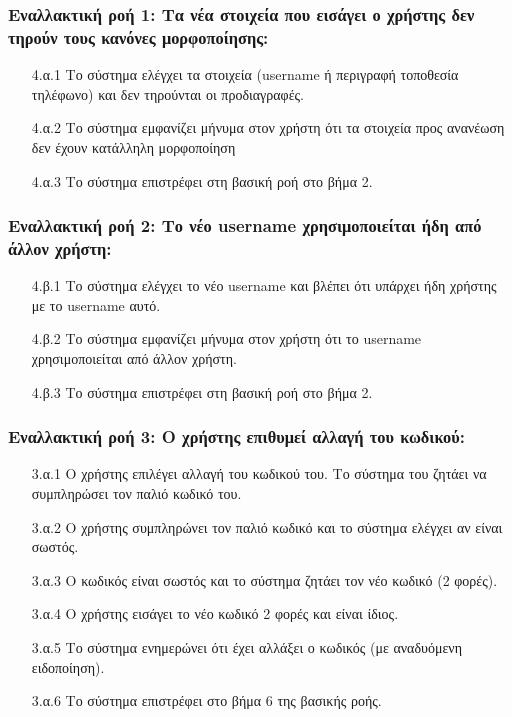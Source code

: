 \documentclass[12pt,a4paper]{article}
\begin{document}
\subsubsection*{Εναλλακτική ροή 1: Τα νέα στοιχεία που εισάγει ο χρήστης δεν τηρούν τους κανόνες μορφοποίησης:}
\begin{enumerate}
    \item [4.α.1] Το σύστημα ελέγχει τα στοιχεία (username ή περιγραφή τοποθεσία τηλέφωνο) και δεν τηρούνται οι προδιαγραφές.
    \item [4.α.2] Το σύστημα εμφανίζει μήνυμα στον χρήστη ότι τα στοιχεία προς ανανέωση δεν έχουν κατάλληλη μορφοποίηση
    \item [4.α.3] Το σύστημα επιστρέφει στη βασική ροή στο βήμα 2.  
\end{enumerate}

\subsubsection*{Εναλλακτική ροή 2: Το νέο username χρησιμοποιείται ήδη από άλλον χρήστη:}
\begin{enumerate}
    \item [4.β.1] Το σύστημα ελέγχει το νέο username και βλέπει ότι υπάρχει ήδη χρήστης με το username αυτό. 
    \item [4.β.2] Το σύστημα εμφανίζει μήνυμα στον χρήστη ότι το username χρησιμοποιείται από άλλον χρήστη.  
    \item [4.β.3] Το σύστημα επιστρέφει στη βασική ροή στο βήμα 2.
\end{enumerate}

\subsubsection*{Εναλλακτική ροή 3: Ο χρήστης επιθυμεί αλλαγή του κωδικού:}
\begin{enumerate}
    \item [3.α.1] Ο χρήστης επιλέγει αλλαγή του κωδικού του. Το σύστημα του ζητάει να συμπληρώσει τον παλιό κωδικό του.
    \item [3.α.2] Ο χρήστης συμπληρώνει τον παλιό κωδικό και το σύστημα ελέγχει αν είναι σωστός.
    \item [3.α.3] Ο κωδικός είναι σωστός και το σύστημα ζητάει τον νέο κωδικό (2 φορές).
    \item [3.α.4] Ο χρήστης εισάγει το νέο κωδικό 2 φορές και είναι ίδιος.
    \item [3.α.5] Το σύστημα ενημερώνει ότι έχει αλλάξει ο κωδικός (με αναδυόμενη ειδοποίηση).
    \item [3.α.6] Το σύστημα επιστρέφει στο βήμα 6 της βασικής ροής.
\end{enumerate}
\end{document}
